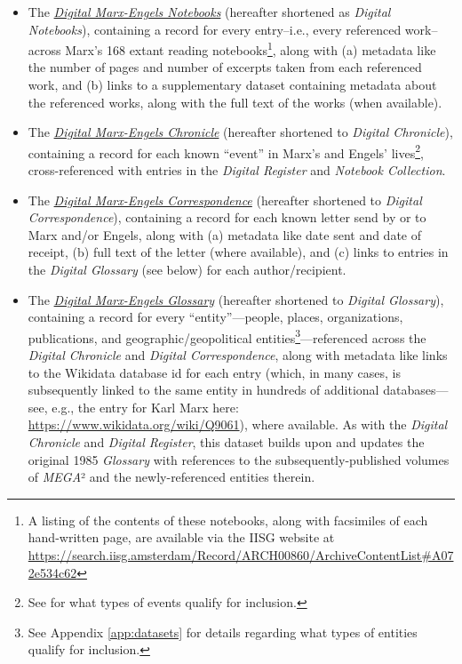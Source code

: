 \begin{itemize}
    \item The \href{https://airtable.com/shr54mI2zLUNzPQUB}{\textit{Digital Marx-Engels Notebooks}} (hereafter shortened as \textit{Digital Notebooks}), containing a record for every entry--i.e., every referenced work--across Marx's 168 extant reading notebooks\footnote{A listing of the contents of these notebooks, along with facsimiles of each hand-written page, are available via the IISG website at \href{https://search.iisg.amsterdam/Record/ARCH00860/ArchiveContentList\#A072e534c62}{https://search.iisg.amsterdam/Record/ARCH00860/ArchiveContentList\#A072e534c62}}, along with (a) metadata like the number of pages and number of excerpts taken from each referenced work, and (b) links to a supplementary dataset containing metadata about the referenced works, along with the full text of the works (when available).
    
    \item The \href{https://airtable.com/shrp3Al2yPCxmoG15}{\textit{Digital Marx-Engels Chronicle}} (hereafter shortened to \textit{Digital Chronicle}), containing a record for each known ``event'' in Marx's and Engels' lives\footnote{See \cite{draper_marx-engels_1985a} for what types of events qualify for inclusion.}, cross-referenced with entries in the \textit{Digital Register} and \textit{Notebook Collection}.
    
    \item The \href{https://airtable.com/shrAJhrqLk8y3qySU}{\textit{Digital Marx-Engels Correspondence}} (hereafter shortened to \textit{Digital Correspondence}), containing a record for each known letter send by or to Marx and/or Engels, along with (a) metadata like date sent and date of receipt, (b) full text of the letter (where available), and (c) links to entries in the \textit{Digital Glossary} (see below) for each author/recipient.
    
    \item The \href{https://airtable.com/shrVoS77J9BOJiDbF}{\textit{Digital Marx-Engels Glossary}} (hereafter shortened to \textit{Digital Glossary}), containing a record for every ``entity''---people, places, organizations, publications, and geographic/geopolitical entities\footnote{See Appendix \ref{app:datasets} for details regarding what types of entities qualify for inclusion.}---referenced across the \textit{Digital Chronicle} and \textit{Digital Correspondence}, along with metadata like links to the Wikidata database id for each entry (which, in many cases, is subsequently linked to the same entity in hundreds of additional databases---see, e.g., the entry for Karl Marx here: \href{https://www.wikidata.org/wiki/Q9061}{https://www.wikidata.org/wiki/Q9061}), where available. As with the \textit{Digital Chronicle} and \textit{Digital Register}, this dataset builds upon and updates the original 1985 \textit{Glossary} with references to the subsequently-published volumes of \textit{MEGA}² and the newly-referenced entities therein.
\end{itemize}

